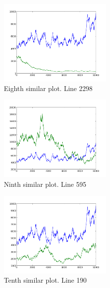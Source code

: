 \begin{figure}[h!]
    \centering
    \includegraphics[width=0.5\textwidth]{images/2298.png}
    \caption{Eighth similar plot.  Line 2298}
    \label{fig:ex1_8}
\end{figure}

\begin{figure}[h!]
    \centering
    \includegraphics[width=0.5\textwidth]{images/595.png}
    \caption{Ninth similar plot.  Line 595}
    \label{fig:ex1_9}
\end{figure}

\begin{figure}[h!]
    \centering
    \includegraphics[width=0.5\textwidth]{images/190.png}
    \caption{Tenth similar plot.  Line 190}
    \label{fig:ex1_10}
\end{figure}
